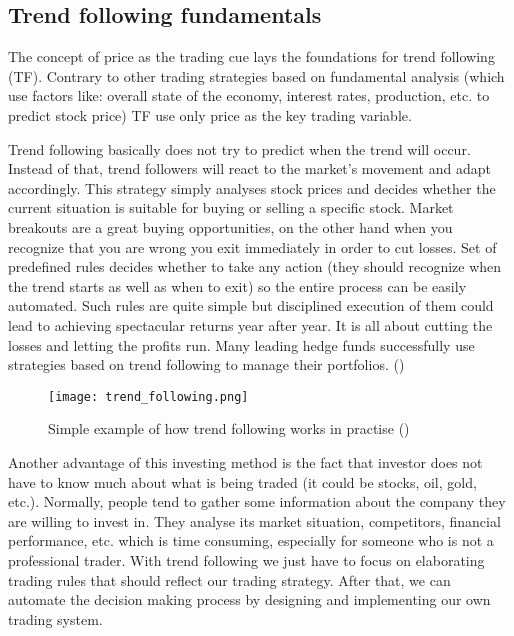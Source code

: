 \subsection{Trend following fundamentals}
\label{sec:trend_following_fundamentals}

The concept of price as the trading cue lays the foundations for trend following (TF). 
Contrary to other trading strategies based on fundamental analysis (which use factors like: overall state of the economy, interest rates, production, etc. to predict stock price)
TF use only price as the key trading variable. 

Trend following basically does not try to predict when the trend will occur. 
Instead of that, trend followers will react to the market's movement and adapt accordingly.
This strategy simply analyses stock prices and decides whether the current situation is suitable for buying or selling a specific stock.
Market breakouts are a great buying opportunities, on the other hand when you recognize that you are wrong you exit immediately in order to cut losses.
Set of predefined rules decides  whether to take any action (they should recognize when the trend starts as well as when to exit) so the entire process can be easily automated.
Such rules are quite simple but disciplined execution of them could lead to achieving spectacular returns year after year.
It is all about cutting the losses and letting the profits run.
Many leading hedge funds successfully use strategies based on trend following to manage their portfolios. (\cite{Trend01})  

\begin{figure}[ht]
  \begin{center}
    \texttt{[image: trend\_following.png]}
  \end{center}
  \caption{Simple example of how trend following works in practise (\cite{Trend01})}
\end{figure}

Another advantage of this investing method is the fact that investor does not have to know much about what is being traded (it could be stocks, oil, gold, etc.).
Normally, people tend to gather some information about the company they are willing to invest in. 
They analyse its market situation, competitors, financial performance, etc. which is time consuming, especially for someone who is not a professional trader.
With trend following we just have to focus on elaborating trading rules that should reflect our trading strategy.
After that, we can automate the decision making process by designing and implementing our own trading system.   

